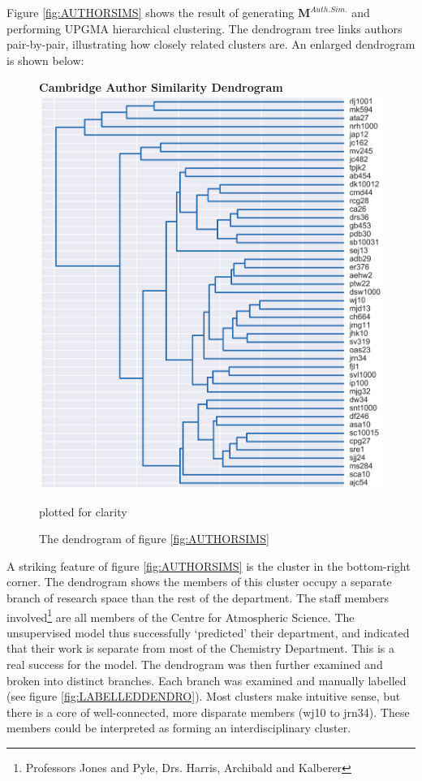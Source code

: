 Figure \ref{fig:AUTHORSIMS} shows the result of generating $\textbf{M}^{Auth. Sim.}$ and performing UPGMA hierarchical clustering. The dendrogram tree links authors pair-by-pair, illustrating how closely related clusters are. An enlarged dendrogram is shown below:
\begin{center}
\begin{figure}[H]
  \centering
  \textbf{Cambridge Author Similarity Dendrogram}
    \includegraphics[width=\textwidth]{Analysis/dendro.png}
    \caption[Cambridge Author Similarity Dendrogram]{The dendrogram of figure \ref{fig:AUTHORSIMS}} plotted for clarity
\end{figure} 
\label{fig:DENDRO}

\end{center}
A striking feature of figure \ref{fig:AUTHORSIMS} is the cluster in the bottom-right corner. The dendrogram shows the members of this cluster occupy a separate branch of research space than the rest of the department. The staff members involved\footnote{Professors Jones and Pyle, Drs. Harris, Archibald and Kalberer} are all members of the Centre for Atmospheric Science. The unsupervised model thus successfully `predicted' their department, and indicated that their work is separate from most of the Chemistry Department. This is a real success for the model. The dendrogram was then further examined and broken into distinct branches. Each branch was examined and manually labelled (see figure \ref{fig:LABELLEDDENDRO}). Most clusters make intuitive sense, but there is a core of well-connected, more disparate members (wj10 to jrn34). These members could be interpreted as forming an interdisciplinary cluster.  
